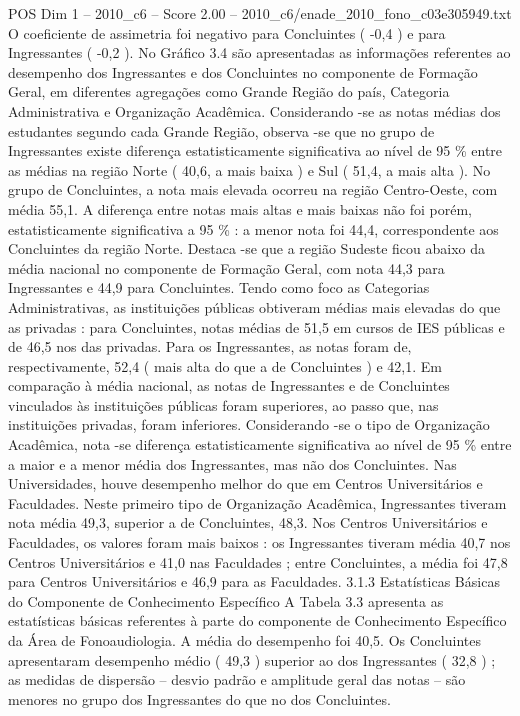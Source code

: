 \begin{textsample}{POS Dim 1 – 2010\_c6 – Score 2.00 – 2010\_c6/enade\_2010\_fono\_c03e305949.txt}
O coeficiente de assimetria foi negativo para Concluintes ( -0,4 ) e para Ingressantes ( -0,2 ).
No Gráfico 3.4 são apresentadas as informações referentes ao desempenho dos Ingressantes e dos Concluintes no componente de Formação Geral, em diferentes agregações como Grande Região do país, Categoria Administrativa e Organização Acadêmica.
Considerando -se as notas médias dos estudantes segundo cada Grande Região, observa -se que no grupo de Ingressantes existe diferença estatisticamente significativa ao nível de 95 \% entre as médias na região Norte ( 40,6, a mais baixa ) e Sul ( 51,4, a mais alta ).
No grupo de Concluintes, a nota mais elevada ocorreu na região Centro-Oeste, com média 55,1.
A diferença entre notas mais altas e mais baixas não foi porém, estatisticamente significativa a 95 \% : a menor nota foi 44,4, correspondente aos Concluintes da região Norte.
Destaca -se que a região Sudeste ficou abaixo da média nacional no componente de Formação Geral, com nota 44,3 para Ingressantes e 44,9 para Concluintes.
Tendo como foco as Categorias Administrativas, as instituições públicas obtiveram médias mais elevadas do que as privadas : para Concluintes, notas médias de 51,5 em cursos de IES públicas e de 46,5 nos das privadas.
Para os Ingressantes, as notas foram de, respectivamente, 52,4 ( mais alta do que a de Concluintes ) e 42,1.
Em comparação à média nacional, as notas de Ingressantes e de Concluintes vinculados às instituições públicas foram superiores, ao passo que, nas instituições privadas, foram inferiores.
Considerando -se o tipo de Organização Acadêmica, nota -se diferença estatisticamente significativa ao nível de 95 \% entre a maior e a menor média dos Ingressantes, mas não dos Concluintes.
Nas Universidades, houve desempenho melhor do que em Centros Universitários e Faculdades.
Neste primeiro tipo de Organização Acadêmica, Ingressantes tiveram nota média 49,3, superior a de Concluintes, 48,3.
Nos Centros Universitários e Faculdades, os valores foram mais baixos : os Ingressantes tiveram média 40,7 nos Centros Universitários e 41,0 nas Faculdades ; entre Concluintes, a média foi 47,8 para Centros Universitários e 46,9 para as Faculdades. 3.1.3 Estatísticas Básicas do Componente de Conhecimento Específico A Tabela 3.3 apresenta as estatísticas básicas referentes à parte do componente de Conhecimento Específico da Área de Fonoaudiologia.
A média do desempenho foi 40,5.
Os Concluintes apresentaram desempenho médio ( 49,3 ) superior ao dos Ingressantes ( 32,8 ) ; as medidas de dispersão – desvio padrão e amplitude geral das notas – são menores no grupo dos Ingressantes do que no dos Concluintes.

\end{textsample}

